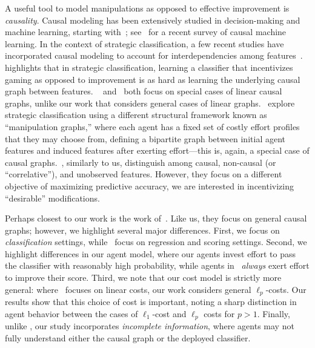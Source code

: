A useful tool to model manipulations as opposed to effective improvement is \emph{causality}. Causal modeling has been extensively studied in decision-making and machine learning, starting with~\cite{pearl2000causality}; see~\cite{kaddour2022causalmachinelearningsurvey} for a recent survey of causal machine learning. 
In the context of strategic classification, a few recent studies have incorporated causal modeling to account for interdependencies among features~\cite{kleinberg2019classifiers,shavit2020incentives,bechavod2022gaming, blum_game_improve,miller2020strategic,horowitz2023causalstrategicclassificationtale}.~\cite{miller2020strategic} highlights that in strategic classification, learning a classifier that incentivizes gaming as opposed to improvement is as hard as learning the underlying causal graph between features.
~\cite{shavit2020incentives} and~\cite{bechavod2022gaming} both focus on special cases of linear causal graphs, unlike our work that considers general cases of linear graphs.~\cite{blum_game_improve} explore strategic classification using a different structural framework known as ``manipulation graphs,'' where each agent has a fixed set of costly effort profiles that they may choose from, defining a bipartite graph between initial agent features and induced features after exerting effort---this is, again, a special case of causal graphs.~\cite{horowitz2023causalstrategicclassificationtale}, similarly to us, distinguish among causal, non-causal (or ``correlative''), and unobserved features. However, they focus on a different objective of maximizing predictive accuracy, we are interested in incentivizing ``desirable'' modifications.

Perhaps closest to our work is the work of~\cite{kleinberg2019classifiers}. Like us, they focus on general causal graphs; however, we highlight several major differences. First, we focus on \emph{classification} settings, while~\cite{kleinberg2019classifiers} focus on regression and scoring settings. Second, we highlight differences in our agent model, where our agents invest effort to pass the classifier with reasonably high probability, while agents in~\cite{kleinberg2019classifiers} \emph{always} exert effort to improve their score. Third, we note that our cost model is strictly more general: where~\cite{kleinberg2019classifiers} focuses on linear costs, our work considers general $\ell_p$-costs. Our results show that this choice of cost is important, noting a sharp distinction in agent behavior between the cases of $\ell_1$-cost and $\ell_p$ costs for $p > 1$. Finally, unlike \cite{kleinberg2019classifiers}, our study incorporates \emph{incomplete information}, where agents may not fully understand either the causal graph or the deployed classifier.


